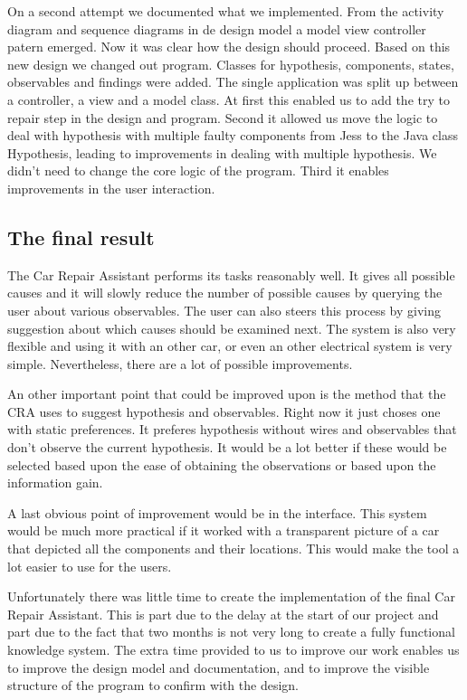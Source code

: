 On a second attempt we documented what we implemented. From the activity diagram and sequence diagrams in de design model a model view controller patern emerged. Now it was clear how the design should proceed. Based on this new design we changed out program. Classes for hypothesis, components, states, observables and findings were added. The single application was split up between a controller, a view and a model class. At first this enabled us to add the try to repair step in the design and program. Second it allowed us move the logic to deal with hypothesis with multiple faulty components from Jess to the Java class Hypothesis, leading to improvements in dealing with multiple hypothesis. We didn't need to change the core logic of the program. Third it enables improvements in the user interaction.

\subsection{The final result}
The Car Repair Assistant performs its tasks reasonably well. It gives all possible causes and it will slowly reduce the number of possible causes by querying the user about various observables. The user can also steers this process by giving suggestion about which causes should be examined next. The system is also very flexible and using it with an other car, or even an other electrical system is very simple. Nevertheless, there are a lot of possible improvements.

An other important point that could be improved upon is the method that the CRA uses to suggest hypothesis and observables. Right now it just choses one with static preferences. It preferes hypothesis without wires and observables that don't observe the current hypothesis. It would be a lot better if these would be selected based upon the ease of obtaining the observations or based upon the information gain.

A last obvious point of improvement would be in the interface. This system would be much more practical if it worked with a transparent picture of a car that depicted all the components and their locations. This would make the tool a lot easier to use for the users.

Unfortunately there was little time to create the implementation of the final Car Repair Assistant. This is part due to the delay at the start of our project and part due to the fact that two months is not very long to create a fully functional knowledge system. The extra time provided to us to improve our work enables us to improve the design model and documentation, and to improve the visible structure of the program to confirm with the design.
